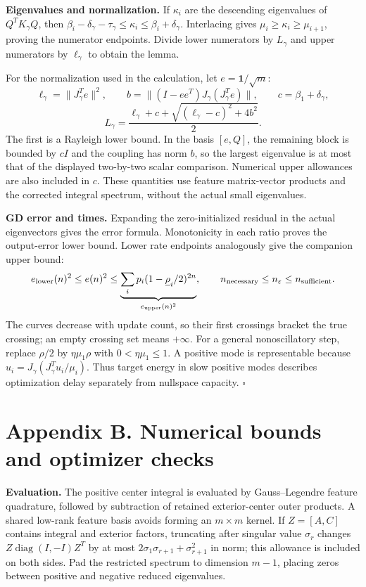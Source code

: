 \documentclass[11pt]{article}
\DeclareMathOperator{\diag}{diag}
\begin{document}
\textbf{Eigenvalues and normalization.} If $\kappa_i$ are the descending
eigenvalues of $Q^TK_\gamma Q$, then
$\beta_i-\delta_\gamma-\tau_\gamma\le\kappa_i\le\beta_i+\delta_\gamma$.
Interlacing gives $\mu_i\ge\kappa_i\ge\mu_{i+1}$, proving the numerator
endpoints. Divide lower numerators by $L_\gamma$ and upper numerators by
$\ell_\gamma$ to obtain the lemma.

For the normalization used in the calculation, let $e=\mathbf1/\sqrt m$:
\[
\ell_\gamma=\|J_\gamma^Te\|^2,\qquad
b=\|(I-ee^T)J_\gamma(J_\gamma^Te)\|,\qquad c=\beta_1+\delta_\gamma,
\]
\[
L_\gamma=\frac{\ell_\gamma+c+\sqrt{(\ell_\gamma-c)^2+4b^2}}2.
\]
The first is a Rayleigh lower bound. In the basis $[e,Q]$, the remaining
block is bounded by $cI$ and the coupling has norm $b$, so the largest
eigenvalue is at most that of the displayed two-by-two scalar comparison.
Numerical upper allowances are also included in $c$. These quantities use
feature matrix-vector products and the corrected integral spectrum,
without the actual small eigenvalues.

\textbf{GD error and times.} Expanding the zero-initialized residual in the actual
eigenvectors gives the error formula. Monotonicity in each ratio proves
the output-error lower bound. Lower rate endpoints analogously give
the companion upper bound:
\[
e_{\rm lower}(n)^2\le e(n)^2\le
\underbrace{\sum_i p_i(1-\underline\rho_i/2)^{2n}}_{e_{\rm upper}(n)^2},
\qquad n_{\rm necessary}\le n_\varepsilon\le n_{\rm sufficient}.
\]
The curves decrease with update count, so their first
crossings bracket the true crossing; an empty crossing set means $+\infty$.
For a general nonoscillatory step, replace $\rho/2$ by $\eta\mu_1\rho$
with $0<\eta\mu_1\le1$.
A positive mode is representable because
$u_i=J_\gamma(J_\gamma^Tu_i/\mu_i)$. Thus target energy in slow positive
modes describes optimization delay separately from nullspace capacity.
\hfill$\square$

\section*{Appendix B. Numerical bounds and optimizer checks}
\textbf{Evaluation.} The positive center integral is evaluated by
Gauss--Legendre feature quadrature, followed by subtraction of retained
exterior-center outer products. A shared low-rank feature basis avoids
forming an $m\times m$ kernel. If $Z=[A,C]$ contains integral and exterior
factors, truncating after singular value $\sigma_r$ changes
$Z\diag(I,-I)Z^T$ by at most
$2\sigma_1\sigma_{r+1}+\sigma_{r+1}^2$ in norm; this allowance is included
on both sides. Pad the restricted spectrum to dimension $m-1$, placing
zeros between positive and negative reduced eigenvalues.
\end{document}

